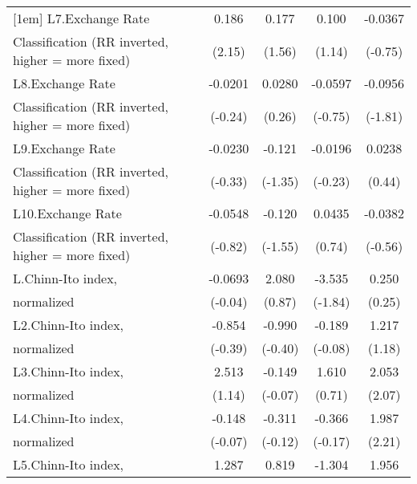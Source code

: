{\begin{tabular}{l*{4}{c}}
[1em]
L7.Exchange Rate    &       0.186\sym{*}  &       0.177         &       0.100         &     -0.0367         \\
Classification (RR inverted, higher = more fixed)&      (2.15)         &      (1.56)         &      (1.14)         &     (-0.75)         \\
[1em]
L8.Exchange Rate    &     -0.0201         &      0.0280         &     -0.0597         &     -0.0956         \\
Classification (RR inverted, higher = more fixed)&     (-0.24)         &      (0.26)         &     (-0.75)         &     (-1.81)         \\
[1em]
L9.Exchange Rate    &     -0.0230         &      -0.121         &     -0.0196         &      0.0238         \\
Classification (RR inverted, higher = more fixed)&     (-0.33)         &     (-1.35)         &     (-0.23)         &      (0.44)         \\
[1em]
L10.Exchange Rate   &     -0.0548         &      -0.120         &      0.0435         &     -0.0382         \\
Classification (RR inverted, higher = more fixed)&     (-0.82)         &     (-1.55)         &      (0.74)         &     (-0.56)         \\
[1em]
L.Chinn-Ito index,  &     -0.0693         &       2.080         &      -3.535         &       0.250         \\
normalized          &     (-0.04)         &      (0.87)         &     (-1.84)         &      (0.25)         \\
[1em]
L2.Chinn-Ito index, &      -0.854         &      -0.990         &      -0.189         &       1.217         \\
normalized          &     (-0.39)         &     (-0.40)         &     (-0.08)         &      (1.18)         \\
[1em]
L3.Chinn-Ito index, &       2.513         &      -0.149         &       1.610         &       2.053\sym{*}  \\
normalized          &      (1.14)         &     (-0.07)         &      (0.71)         &      (2.07)         \\
[1em]
L4.Chinn-Ito index, &      -0.148         &      -0.311         &      -0.366         &       1.987\sym{*}  \\
normalized          &     (-0.07)         &     (-0.12)         &     (-0.17)         &      (2.21)         \\
[1em]
L5.Chinn-Ito index, &       1.287         &       0.819         &      -1.304         &       1.956         \\

\end{tabular}}
